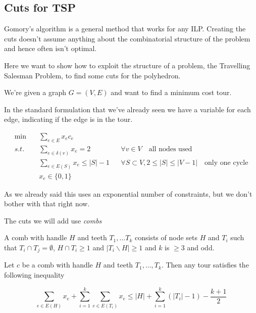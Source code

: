 \subsection{Cuts for TSP}

Gomory's algorithm is a general method that works for any ILP. Creating the cuts doesn't assume anything about the combinatorial structure of the problem and hence often isn't optimal.

Here we want to show how to exploit the structure of a problem, the Travelling Salesman Problem, to find some cuts for the polyhedron.

We're given a graph $G=(V,E)$ and want to find a minimum cost tour. 

In the standard formulation that we've already seen we have a variable for each edge, indicating if the edge is in the tour.

\begin{align*}
\min \quad & \sum_{e\in E} x_e c_e\\
s.t.\quad & \sum_{e\in \delta(v)} x_e = 2 && \forall v\in V \quad \text{all nodes used}\\
	& \sum_{e\in E(S)} x_e \leq |S|-1 && \forall S\subset V, 2\leq |S| \leq |V-1| \quad \text{only one cycle}\\
	& x_e \in \{0,1\}
\end{align*}

As we already said this uses an exponential number of constraints, but we don't bother with that right now.

The cuts we will add use \emph{combs}

\begin{Def}[Comb] %
A comb with handle $H$ and teeth $T_1,\ldots T_k$ consists of node sets $H$ and $T_i$ such that $T_i \cap T_j = \emptyset$, $H\cap T_i\geq 1$ and $|T_i\backslash H |\geq 1$ and $k$ is $\geq 3$ and odd.
\end{Def}


\begin{thm} Let $c$ be a comb with handle $H$ and teeth $T_1,\ldots, T_k$. Then any tour satisfies the following inequality

\[\sum_{e\in E(H)} x_e +\sum_{i=1}^k\sum_{e\in E(T_i)} x_e \leq |H|+\sum_{i=1}^k(|T_i|-1)-\frac{k+1}{2}\]
\end{thm}

